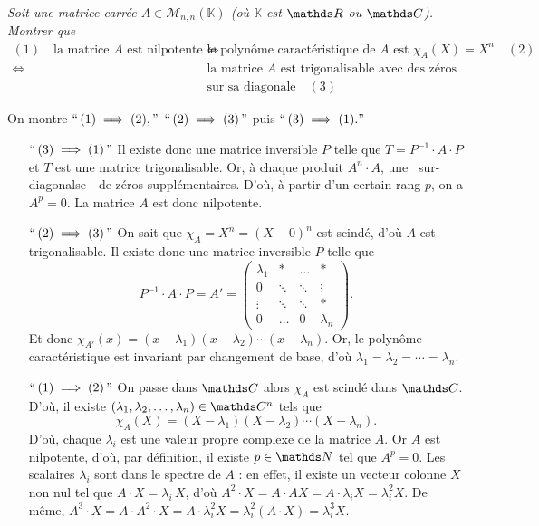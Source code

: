 \begin{exo}\relax
	{\slshape Soit une matrice carrée $A \in \mathscr{M}_{n,n}(\mathds{K})$ (où $\mathds{K}$\/ est $\R$\/ ou $\C$). Montrer que
		\begin{align*}
			(1)\quad\text{la matrice } A \text{ est nilpotente}
			\iff& \text{ le polynôme caractéristique de } A \text{ est } \chi_A(X) = X^n\quad(2)\\
			\iff& \text{ la matrice } A \text{ est trigonalisable avec des zéros}\\
			&\text{ sur sa diagonale} \quad(3)
		\end{align*}
	}

	On montre $``\,(1) \implies (2),"$ $``\,(2) \implies (3)\,"$\/ puis $``\,(3) \implies (1)."$

	\begin{itemize}
		\item[$``\,(3) \implies(1)\,"$] Il existe donc une matrice inversible $P$\/ telle que $T = P^{-1}\cdot A\cdot P$\/ et $T$\/ est une matrice trigonalisable. Or, à chaque produit $A^n \cdot A$, une \guillemotleft~sur-diagonalse~\guillemotright\  de zéros supplémentaires. D'où, à partir d'un certain rang $p$, on a $A^p = 0$. La matrice $A$\/ est donc nilpotente.
		\item[$``\,(2) \implies(3)\,"$] On sait que $\chi_A = X^n = (X-0)^n$\/ est scindé, d'où $A$\/ est trigonalisable.
			Il existe donc une matrice inversible $P$\/ telle que \[
				P^{-1}\cdot A\cdot P = A' = \begin{pmatrix}
					\lambda_1 & * & \ldots & *\\
					0 & \ddots&\ddots&\vdots\\
					\vdots&\ddots&\ddots&*\\
					0&\ldots&0&\lambda_n
				\end{pmatrix}
			.\]
			Et donc $\chi_{A'}(x) = (x-\lambda_1)(x-\lambda_2) \cdots (x-\lambda_n)$.
			Or, le polynôme caractéristique est invariant par changement de base, d'où $\lambda_1 = \lambda_2 = \cdots = \lambda_n$.
		\item[$``\,(1)\implies(2)\,"$] On passe dans $\C$\/ alors $\chi_A$\/ est scindé dans $\C$. D'où, il existe $(\lambda_1, \lambda_2, \ldots, \lambda_n) \in \C^n$\/ tels que \[
			\chi_A(X) = (X - \lambda_1) (X - \lambda_2) \cdots (X-\lambda_n)
		.\]
		D'où, chaque $\lambda_i$\/ est une valeur propre \ul{complexe} de la matrice $A$. Or $A$\/ est nilpotente, d'où, par définition, il existe $p \in \N$\/ tel que $A^p = 0$. Les scalaires $\lambda_i$\/ sont dans le spectre de $A$\/ : en effet, il existe un vecteur colonne $X$\/ non nul tel que $A\cdot X = \lambda_i\,X$, d'où $A^2 \cdot X = A\cdot AX = A\cdot \lambda_iX = \lambda_i^2 X$. De même, $A^3 \cdot X = A \cdot A^2 \cdot X = A \cdot \lambda_i^2 X = \lambda_i^2 (A\cdot X) = \lambda_i^3 X$.

\end{itemize}
\end{exo}

